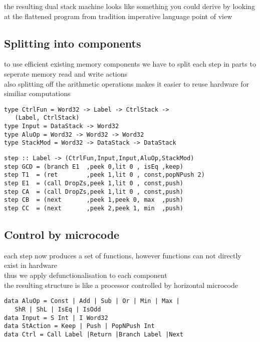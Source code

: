 \documentclass[preprint]{sigplanconf}
\def\codefamily{\sffamily\normalsize}
\def\codesmall{\sffamily\small}
\begin{document}
the resulting dual stack machine looks like something you could derive by looking at the flattened program from tradition imperative language point of view

\subsection{Splitting into components}

to use efficient existing memory components we have to split each step in parts to seperate memory read and write actions \\
also splitting off the arithmetic operations makes it easier to reuse hardware for similiar computations

\begin{lstlisting}
type CtrlFun = Word32 -> Label -> CtrlStack ->
   (Label, CtrlStack)
type Input = DataStack -> Word32
type AluOp = Word32 -> Word32 -> Word32
type StackMod = Word32 -> DataStack -> DataStack
\end{lstlisting}

\lstset{basicstyle=\codesmall}
\begin{lstlisting}
step :: Label -> (CtrlFun,Input,Input,AluOp,StackMod)
step GCD = (branch E1  ,peek 0,lit 0 , isEq ,keep)
step T1  = (ret        ,peek 1,lit 0 , const,popNPush 2)
step E1  = (call DropZs,peek 1,lit 0 , const,push)
step CA  = (call DropZs,peek 1,lit 0 , const,push)
step CB  = (next       ,peek 1,peek 0, max  ,push)
step CC  = (next       ,peek 2,peek 1, min  ,push)
\end{lstlisting}
\lstset{basicstyle=\codefamily}

\subsection{Control by microcode}

each step now produces a set of functions, however functions can not directly exist in hardware \\
thus we apply defunctionalisation to each component \\
the resulting structure is like a processor controlled by horizontal microcode

\begin{lstlisting}
data AluOp = Const | Add | Sub | Or | Min | Max |
   ShR | ShL | IsEq | IsOdd
data Input = S Int | I Word32
data StAction = Keep | Push | PopNPush Int
data Ctrl = Call Label |Return |Branch Label |Next
\end{lstlisting}
\end{document}
